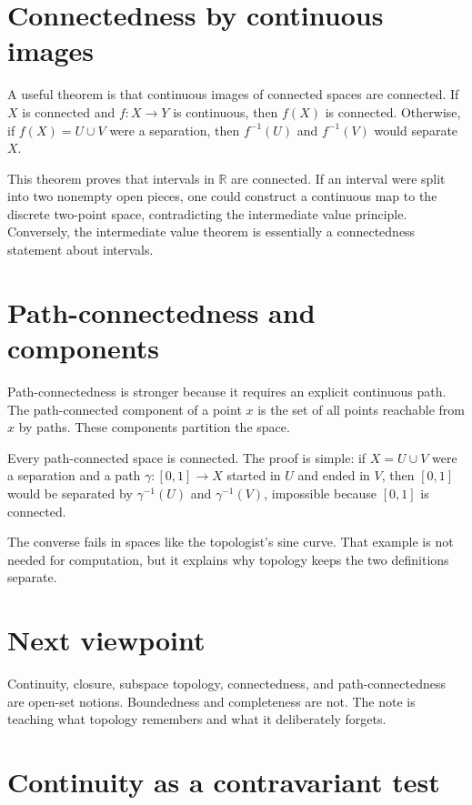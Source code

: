 \section{Connectedness by continuous images}

A useful theorem is that continuous images of connected spaces are connected.  If \(X\) is connected and \(f:X\to Y\) is continuous, then \(f(X)\) is connected.  Otherwise, if \(f(X)=U\cup V\) were a separation, then \(f^{-1}(U)\) and \(f^{-1}(V)\) would separate \(X\).

This theorem proves that intervals in \(\mathbb R\) are connected.  If an interval were split into two nonempty open pieces, one could construct a continuous map to the discrete two-point space, contradicting the intermediate value principle.  Conversely, the intermediate value theorem is essentially a connectedness statement about intervals.

\section{Path-connectedness and components}

Path-connectedness is stronger because it requires an explicit continuous path.  The path-connected component of a point \(x\) is the set of all points reachable from \(x\) by paths.  These components partition the space.

Every path-connected space is connected.  The proof is simple: if \(X=U\cup V\) were a separation and a path \(\gamma:[0,1]\to X\) started in \(U\) and ended in \(V\), then \([0,1]\) would be separated by \(\gamma^{-1}(U)\) and \(\gamma^{-1}(V)\), impossible because \([0,1]\) is connected.

The converse fails in spaces like the topologist's sine curve.  That example is not needed for computation, but it explains why topology keeps the two definitions separate.

\section{Next viewpoint}

Continuity, closure, subspace topology, connectedness, and path-connectedness are open-set notions.  Boundedness and completeness are not.  The note is teaching what topology remembers and what it deliberately forgets.

\section{Continuity as a contravariant test}

